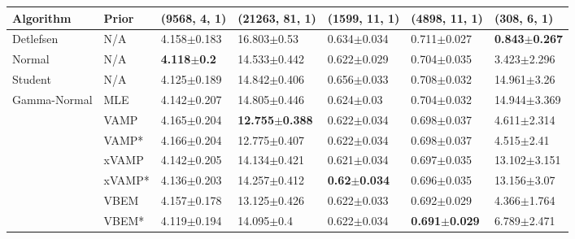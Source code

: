 \begin{tabular}{lllllll}
Algorithm & Prior& (9568, 4, 1)& (21263, 81, 1)& (1599, 11, 1)& (4898, 11, 1)& (308, 6, 1)\\
\midrule
Detlefsen & N/A &         4.158$\pm$0.183 &            16.803$\pm$0.53 &          0.634$\pm$0.034 &           0.711$\pm$0.027 &  \textbf{0.843$\pm$0.267} \\
Normal & N/A &  \textbf{4.118$\pm$0.2} &           14.533$\pm$0.442 &          0.622$\pm$0.029 &           0.704$\pm$0.035 &           3.423$\pm$2.296 \\
Student & N/A &         4.125$\pm$0.189 &           14.842$\pm$0.406 &          0.656$\pm$0.033 &           0.708$\pm$0.032 &           14.961$\pm$3.26 \\
Gamma-Normal & MLE &         4.142$\pm$0.207 &           14.805$\pm$0.446 &           0.624$\pm$0.03 &           0.704$\pm$0.032 &          14.944$\pm$3.369 \\
             & VAMP &         4.165$\pm$0.204 &  \textbf{12.755$\pm$0.388} &          0.622$\pm$0.034 &           0.698$\pm$0.037 &           4.611$\pm$2.314 \\
             & VAMP* &         4.166$\pm$0.204 &           12.775$\pm$0.407 &          0.622$\pm$0.034 &           0.698$\pm$0.037 &            4.515$\pm$2.41 \\
             & xVAMP &         4.142$\pm$0.205 &           14.134$\pm$0.421 &          0.621$\pm$0.034 &           0.697$\pm$0.035 &          13.102$\pm$3.151 \\
             & xVAMP* &         4.136$\pm$0.203 &           14.257$\pm$0.412 &  \textbf{0.62$\pm$0.034} &           0.696$\pm$0.035 &           13.156$\pm$3.07 \\
             & VBEM &         4.157$\pm$0.178 &           13.125$\pm$0.426 &          0.622$\pm$0.033 &           0.692$\pm$0.029 &           4.366$\pm$1.764 \\
             & VBEM* &         4.119$\pm$0.194 &             14.095$\pm$0.4 &          0.622$\pm$0.034 &  \textbf{0.691$\pm$0.029} &           6.789$\pm$2.471 \\
\bottomrule
\end{tabular}

